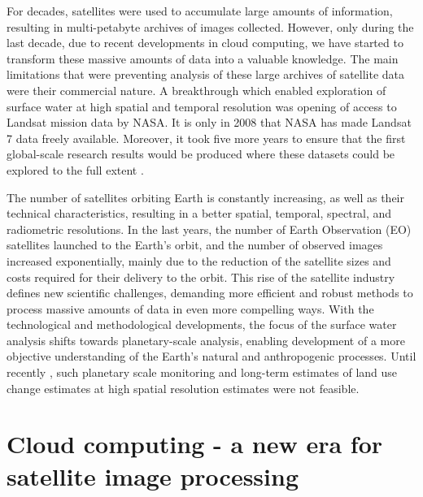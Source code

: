 For decades, satellites were used to accumulate large amounts of information, resulting in multi-petabyte archives of images collected. However, only during the last decade, due to recent developments in cloud computing,  we have started to transform these massive amounts of data into a valuable knowledge. The main limitations that were preventing analysis of these large archives of satellite data were their commercial nature. A breakthrough which enabled exploration of surface water at high spatial and temporal resolution was opening of access to Landsat mission data by NASA. It is only in 2008 that NASA has made Landsat 7 data freely available. Moreover, it took five more years to ensure that the first global-scale research results would be produced where these datasets could be explored to the full extent \citep{Hansen2013}.


The number of satellites orbiting Earth is constantly increasing, as well as their technical characteristics, resulting in a better spatial, temporal, spectral, and radiometric resolutions. In the last years, the number of Earth Observation (EO) satellites launched to the Earth's orbit, and the number of observed images increased exponentially, mainly due to the reduction of the satellite sizes and costs required for their delivery to the orbit. This rise of the satellite industry defines new scientific challenges, demanding more efficient and robust methods to process massive amounts of data in even more compelling ways. With the technological and methodological developments, the focus of the surface water analysis shifts towards planetary-scale analysis, enabling development of a more objective understanding of the Earth's natural and anthropogenic processes. Until recently \citep{Hansen2013, pekel2016high}, such planetary scale monitoring and long-term estimates of land use change estimates at high spatial resolution estimates were not feasible. 

\section{Cloud computing - a new era for satellite image processing}


